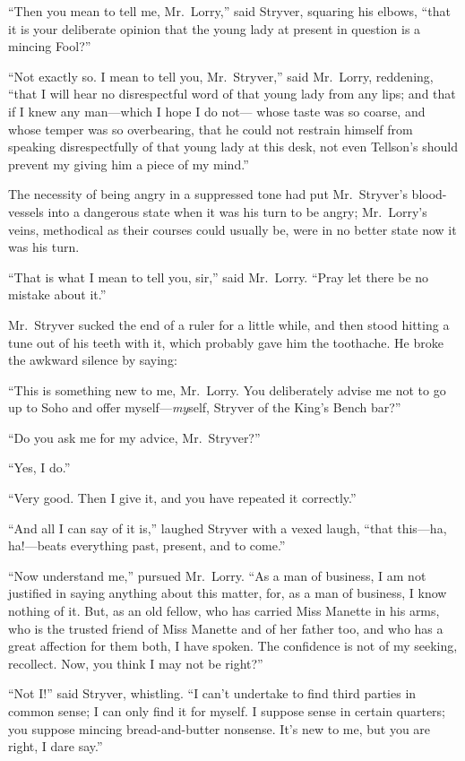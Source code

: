 ``Then you mean to tell me, Mr.\ Lorry,'' said Stryver, squaring his
elbows, ``that it is your deliberate opinion that the young lady at
present in question is a mincing Fool?''

``Not exactly so.  I mean to tell you, Mr.\ Stryver,'' said Mr.\ Lorry,
reddening, ``that I will hear no disrespectful word of that young lady
from any lips; and that if I knew any man---which I hope I do not---%
whose taste was so coarse, and whose temper was so overbearing,
that he could not restrain himself from speaking disrespectfully of
that young lady at this desk, not even Tellson's should prevent my
giving him a piece of my mind.''

The necessity of being angry in a suppressed tone had put Mr.\ Stryver's
blood-vessels into a dangerous state when it was his turn to be angry;
Mr.\ Lorry's veins, methodical as their courses could usually be,
were in no better state now it was his turn.

``That is what I mean to tell you, sir,'' said Mr.\ Lorry.
``Pray let there be no mistake about it.''

Mr.\ Stryver sucked the end of a ruler for a little while, and then
stood hitting a tune out of his teeth with it, which probably gave
him the toothache.  He broke the awkward silence by saying:

``This is something new to me, Mr.\ Lorry.  You deliberately advise
me not to go up to Soho and offer myself---\emph{my}self, Stryver of
the King's Bench bar?''

``Do you ask me for my advice, Mr.\ Stryver?''

``Yes, I do.''

``Very good.  Then I give it, and you have repeated it correctly.''

``And all I can say of it is,'' laughed Stryver with a vexed laugh,
``that this---ha, ha!---beats everything past, present, and to come.''

``Now understand me,'' pursued Mr.\ Lorry.  ``As a man of business, I
am not justified in saying anything about this matter, for, as a man
of business, I know nothing of it.  But, as an old fellow, who has
carried Miss Manette in his arms, who is the trusted friend of
Miss Manette and of her father too, and who has a great affection for
them both, I have spoken.  The confidence is not of my seeking,
recollect.  Now, you think I may not be right?''

``Not I!'' said Stryver, whistling.  ``I can't undertake to find third
parties in common sense; I can only find it for myself.  I suppose
sense in certain quarters; you suppose mincing bread-and-butter
nonsense.  It's new to me, but you are right, I dare say.''

